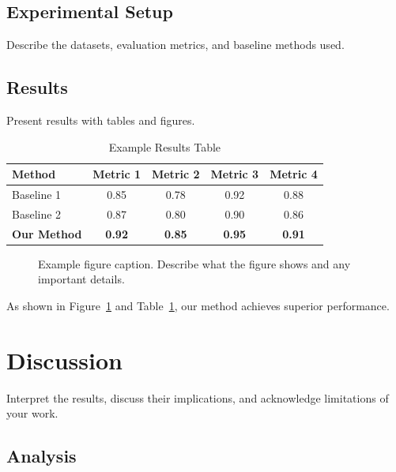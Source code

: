 \documentclass[11pt,a4paper]{article}
\theoremstyle{definition}
\theoremstyle{remark}
\begin{document}
\subsection{Experimental Setup}

Describe the datasets, evaluation metrics, and baseline methods used.

\subsection{Results}

Present results with tables and figures.

\begin{table}[htbp]
\centering
\caption{Example Results Table}
\label{tab:results}
\begin{tabular}{@{}lcccc@{}}
\toprule
Method & Metric 1 & Metric 2 & Metric 3 & Metric 4 \\
\midrule
Baseline 1 & 0.85 & 0.78 & 0.92 & 0.88 \\
Baseline 2 & 0.87 & 0.80 & 0.90 & 0.86 \\
\textbf{Our Method} & \textbf{0.92} & \textbf{0.85} & \textbf{0.95} & \textbf{0.91} \\
\bottomrule
\end{tabular}
\end{table}

\begin{figure}[htbp]
\centering
\caption{Example figure caption. Describe what the figure shows and any important details.}
\label{fig:example}
\end{figure}

As shown in Figure~\ref{fig:example} and Table~\ref{tab:results}, our method achieves superior performance.

\section{Discussion}
\label{sec:discussion}

Interpret the results, discuss their implications, and acknowledge limitations of your work.

\subsection{Analysis}
\end{document}
